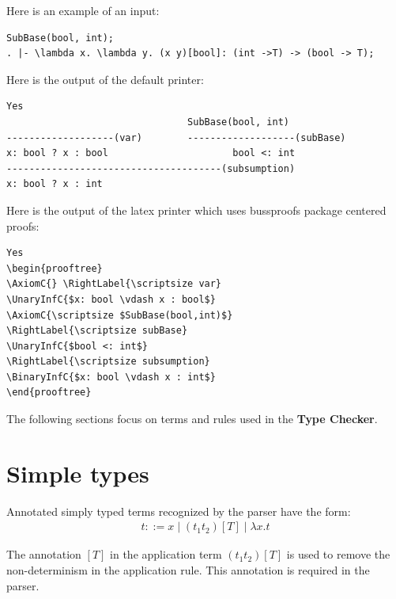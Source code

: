 \documentclass[12pt,a4paper]{article}
\begin{document}
Here is an example of an input:



\begin{lstlisting}  
SubBase(bool, int);
. |- \lambda x. \lambda y. (x y)[bool]: (int ->T) -> (bool -> T);
\end{lstlisting}

Here is the output of the default printer:


\begin{lstlisting}  
Yes
                                SubBase(bool, int)
-------------------(var)        -------------------(subBase)
x: bool ? x : bool                      bool <: int
--------------------------------------(subsumption)
x: bool ? x : int

\end{lstlisting}

Here is the output of the latex printer which uses bussproofs package centered proofs:


\begin{lstlisting} 
Yes
\begin{prooftree}
\AxiomC{} \RightLabel{\scriptsize var}
\UnaryInfC{$x: bool \vdash x : bool$}
\AxiomC{\scriptsize $SubBase(bool,int)$}
\RightLabel{\scriptsize subBase}
\UnaryInfC{$bool <: int$}
\RightLabel{\scriptsize subsumption}
\BinaryInfC{$x: bool \vdash x : int$}
\end{prooftree}

\end{lstlisting} 

The following sections focus on terms and rules used in the \textbf{Type Checker}. 

\section{Simple types} \label{sec:simple}

Annotated simply typed terms recognized by the parser have the form:
\begin{align*}
t::= x \;|\; (t_1 t_2)[T]\;|\; \lambda x.t
\end{align*}

The annotation $[T]$ in the application term $(t_1 t_2)[T]$ is used to remove the non-determinism in the application rule. This annotation is required in the parser. 
\end{document}

